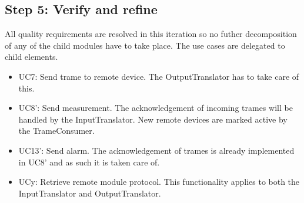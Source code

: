 \subsection{Step 5: Verify and refine}
\label{add:it2/verification}

\npar All quality requirements are resolved in this iteration so no futher
decomposition of any of the child modules have to take place. The use cases
are delegated to child elements. 

\begin{itemize}
	\item UC7: Send trame to remote device. The OutputTranslator has to take care
	of this. 
  	\item UC8': Send measurement. The acknowledgement of incoming trames will
  	be handled by the InputTranslator. New remote devices are marked active by
  	the TrameConsumer. 
  	\item UC13': Send alarm. The acknowledgement of trames is already implemented
  	in UC8' and as such it is taken care of.
  	\item UCy: Retrieve remote module protocol. This functionality applies to
  	both the InputTranslator and OutputTranslator. 
\end{itemize}